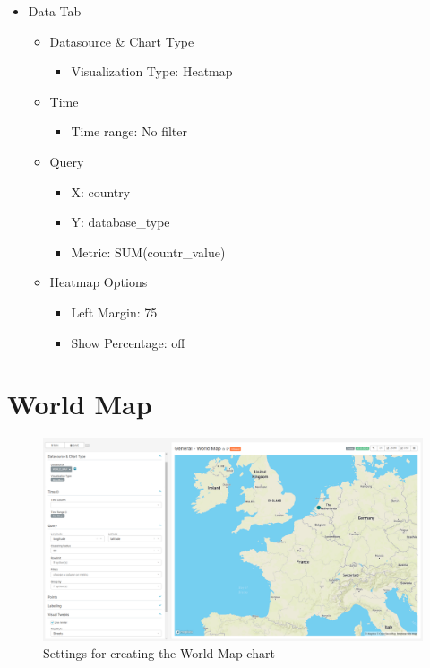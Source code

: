 \documentclass[
]{book}
\providecommand{\tightlist}{%
  \setlength{\itemsep}{0pt}\setlength{\parskip}{0pt}}
\begin{document}
\begin{itemize}
\item
  Data Tab

  \begin{itemize}
  \item
    Datasource \& Chart Type

    \begin{itemize}
    \tightlist
    \item
      Visualization Type: Heatmap
    \end{itemize}
  \item
    Time

    \begin{itemize}
    \tightlist
    \item
      Time range: No filter
    \end{itemize}
  \item
    Query

    \begin{itemize}
    \item
      X: country
    \item
      Y: database\_type
    \item
      Metric: SUM(countr\_value)
    \end{itemize}
  \item
    Heatmap Options

    \begin{itemize}
    \tightlist
    \item
      Left Margin: 75
    \item
      Show Percentage: off
    \end{itemize}
  \end{itemize}
\end{itemize}

\hypertarget{world-map}{%
\section{World Map}\label{world-map}}

\begin{figure}
\includegraphics[width=1\linewidth]{images/03-general/06-world_map} \caption{Settings for creating the World Map chart}\label{fig:worldMap}
\end{figure}
\end{document}
